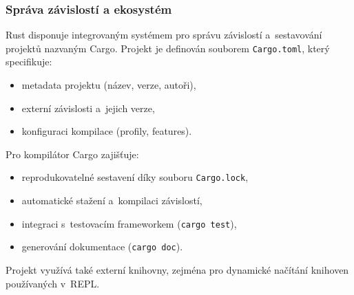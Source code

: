 \subsubsection{Správa závislostí a ekosystém}
\label{sec:rust-cargo}

Rust disponuje integrovaným systémem pro správu závislostí
a~sestavování projektů nazvaným Cargo. Projekt je definován
souborem \texttt{Cargo.toml}, který specifikuje:
\begin{itemize}
	\item metadata projektu (název, verze, autoři),
	\item externí závislosti a~jejich verze,
	\item konfiguraci kompilace (profily, features).
\end{itemize}

Pro kompilátor \Roth{} Cargo zajišťuje:
\begin{itemize}
	\item reprodukovatelné sestavení díky souboru \texttt{Cargo.lock},
	\item automatické stažení a~kompilaci závislostí,
	\item integraci s~testovacím frameworkem (\texttt{cargo test}),
	\item generování dokumentace (\texttt{cargo doc}).
\end{itemize}

Projekt využívá také externí knihovny, zejména pro dynamické načítání
knihoven používaných v~REPL.
